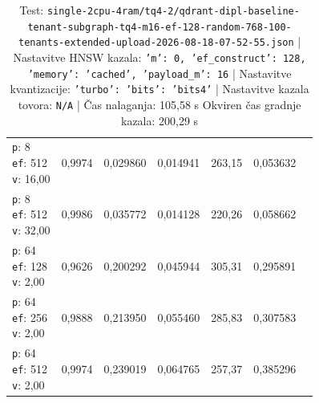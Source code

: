 \begin{table}[htbp]
\begin{tabularx}{\textwidth}{Xrrrrrr}
    \makecell{\texttt{p}: 8\\\texttt{ef}: 512\\\texttt{v}: 16,00} & 0,9974 & 0,029860 & 0,014941 & 263,15 & 0,053632 \\
    \makecell{\texttt{p}: 8\\\texttt{ef}: 512\\\texttt{v}: 32,00} & 0,9986 & 0,035772 & 0,014128 & 220,26 & 0,058662 \\
    \makecell{\texttt{p}: 64\\\texttt{ef}: 128\\\texttt{v}: 2,00} & 0,9626 & 0,200292 & 0,045944 & 305,31 & 0,295891 \\
    \makecell{\texttt{p}: 64\\\texttt{ef}: 256\\\texttt{v}: 2,00} & 0,9888 & 0,213950 & 0,055460 & 285,83 & 0,307583 \\
    \makecell{\texttt{p}: 64\\\texttt{ef}: 512\\\texttt{v}: 2,00} & 0,9974 & 0,239019 & 0,064765 & 257,37 & 0,385296 \\
    \bottomrule
  \end{tabularx}
\caption* {Test: \texttt{single-2cpu-4ram/tq4-2/qdrant-dipl-baseline-tenant-subgraph-tq4-m16-ef-128-random-768-100-tenants-extended-upload-2026-08-18-07-52-55.json} | Nastavitve HNSW kazala: \texttt{{'m': 0, 'ef\_construct': 128, 'memory': 'cached', 'payload\_m': 16}} | Nastavitve kvantizacije: \texttt{{'turbo': {'bits': 'bits4'}}} | Nastavitve kazala tovora: \texttt{N/A} | Čas nalaganja: 105,58 s Okviren čas gradnje kazala: 200,29 s}\end{table}


